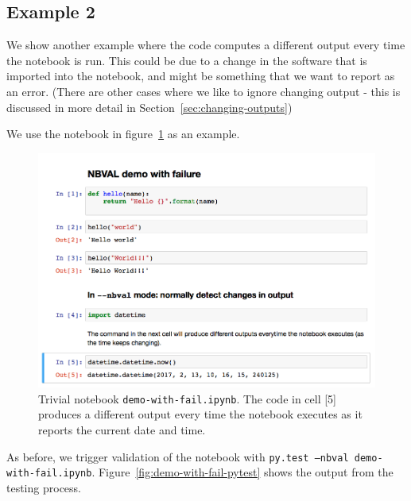 \documentclass{deliverablereport}
\begin{document}
\subsection{Example 2}
We show another example where the code computes a different output
every time the notebook is run. This could be due to a change in the
software that is imported into the notebook, and might be something
that we want to report as an error. (There are other cases where we
like to ignore changing output - this is discussed in more detail in Section~\ref{sec:changing-outputs})

We use the notebook in figure~\ref{fig:demo-with-fail-ipynb} as an
example.

\begin{figure}[ht]
  \centering
  \includegraphics[width=1\textwidth]{examples/demo-with-fail.png}
  \caption{Trivial notebook \texttt{demo-with-fail.ipynb}. The code in
    cell [5] produces a different output every time the notebook
    executes as it reports the current date and time. \label{fig:demo-with-fail-ipynb}}
\end{figure}

As before, we trigger validation of the notebook with \texttt{py.test --nbval demo-with-fail.ipynb}. Figure~\ref{fig:demo-with-fail-pytest} shows the output
from the testing process.
\end{document}
